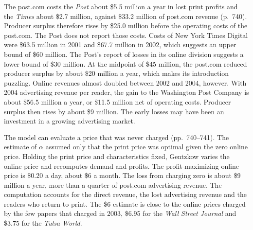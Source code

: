  The post.com costs the \textit{Post} about \$5.5 million a year in lost print profits and the
\textit{Times} about \$2.7 million, against \$33.2 million of post.com revenue (p.~740). Producer surplus therefore
rises by \$25.0 million before the operating costs of the post.com. The Post does not report those costs. Costs of New
York Times Digital were \$63.5 million in 2001 and \$67.7 million in 2002, which suggests an upper bound of \$60 million.
The Post's report of losses in its online division suggests a lower bound of \$30 million. At the midpoint of \$45
million, the post.com reduced producer surplus by about \$20 million a year, which makes its introduction puzzling.
Online revenues almost doubled between 2002 and 2004, however. With 2004 advertising revenue per reader, the gain to the
Washington Post Company is about \$56.5 million a year, or \$11.5 million net of operating costs. Producer surplus then
rises by about \$9 million. The early losses may have been an investment in a growing advertising market.

 The model can evaluate a price that was never charged (pp.~740--741). The estimate of $\alpha$
assumed only that the print price was optimal given the zero online price. Holding the print price and characteristics
fixed, Gentzkow varies the online price and recomputes demand and profits. The profit-maximizing online price is \$0.20
a day, about \$6 a month. The loss from charging zero is about \$9 million a year, more than a quarter of post.com
advertising revenue. The computation accounts for the direct revenue, the lost advertising revenue and the readers who
return to print. The \$6 estimate is close to the online prices charged by the few papers that charged in 2003, \$6.95
for the \textit{Wall Street Journal} and \$3.75 for the \textit{Tulsa World}.

